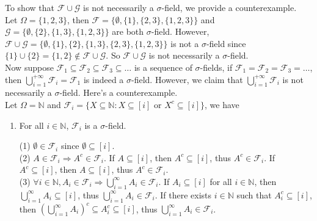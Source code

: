 \documentclass[a4paper, justified]{tufte-handout}
\begin{document}
\begin{solution}
  To show that $\mathcal{F} \cup \mathcal{G}$ is not necessarily a $\sigma$-field, we provide a counterexample. \\
    Let $\Omega = \{1, 2, 3\}$, then $\mathcal{F} = \{\emptyset, \{1\}, \{2, 3\}, \{1, 2, 3\}\}$ and $\mathcal{G} = \{\emptyset, \{2\}, \{1, 3\}, \{1, 2, 3\}\}$ are both $\sigma$-field. However, $\mathcal{F} \cup \mathcal{G} = \{\emptyset, \{1\}, \{2\}, \{1, 3\}, \{2, 3\}, \{1, 2, 3\}\}$ is not a $\sigma$-field since $\{1\} \cup \{2\} = \{1, 2\} \notin \mathcal{F} \cup \mathcal{G}$. So $\mathcal{F} \cup \mathcal{G}$ is not necessarily a $\sigma$-field.\\
    Now suppose $\mathcal{F}_1 \subseteq \mathcal{F}_2 \subseteq \mathcal{F}_3 \subseteq \ldots$ is a sequence of $\sigma$-fields, if $\mathcal{F}_1 = \mathcal{F}_2 = \mathcal{F}_3 = \ldots$, then $\bigcup_{i=1}^{+\infty} \mathcal{F}_i = \mathcal{F}_1$ is indeed a $\sigma$-field. However, 
    we claim that \(\bigcup_{i=1}^{+\infty} \mathcal{F}_i\) is not necessarily a $\sigma$-field. Here's a counterexample. \\
    Let $\Omega = \mathbb{N}$ and $\mathcal{F}_i = \{X \subseteq \mathbb{N}: X \subseteq [i] \text{ or }X^c \subseteq [i]\}$, we have
    \begin{enumerate}[1.]
      \item For all $i \in \mathbb{N}$, $\mathcal{F}_i$ is a $\sigma$-field.
      
      (1) $\emptyset \in \mathcal{F}_i$ since $\emptyset \subseteq [i]$.\\
      (2) $A \in \mathcal{F}_i \Rightarrow A^c \in \mathcal{F}_i$. If $A \subseteq [i]$, then $A^c \subseteq [i]$, thus $A^c \in \mathcal{F}_i$. If $A^c \subseteq [i]$, then $A \subseteq [i]$, thus $A^c \in \mathcal{F}_i$.\\
      (3) $\forall i \in \mathbb{N}, A_i \in \mathcal{F}_i \Rightarrow \bigcup_{i=1}^\infty A_i \in \mathcal{F}_i$. If $A_i \subseteq [i]$ for all $i \in \mathbb{N}$, then $\bigcup_{i=1}^\infty A_i \subseteq [i]$, thus $\bigcup_{i=1}^\infty A_i \in \mathcal{F}_i$. If there exists $i \in \mathbb{N}$ such that $A_i^c \subseteq [i]$, then $(\bigcup_{i=1}^\infty A_i)^c \subseteq A_i^c \subseteq [i]$, thus $\bigcup_{i=1}^\infty A_i \in \mathcal{F}_i$.
    
      

\end{enumerate}
\end{solution}
\end{document}
